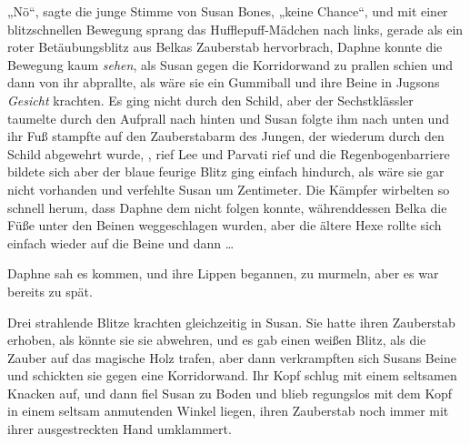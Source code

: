 „Nö“, sagte die junge Stimme von Susan Bones, „keine Chance“, und mit einer blitzschnellen Bewegung sprang das Hufflepuff-Mädchen nach links, gerade als ein roter Betäubungsblitz aus Belkas Zauberstab hervorbrach, Daphne konnte die Bewegung kaum \emph{sehen}, als Susan gegen die Korridorwand zu prallen schien und dann von ihr abprallte, als wäre sie ein Gummiball und ihre Beine in Jugsons \emph{Gesicht} krachten. Es ging nicht durch den Schild, aber der Sechstklässler taumelte durch den Aufprall nach hinten und Susan folgte ihm nach unten und ihr Fuß stampfte auf den Zauberstabarm des Jungen, der wiederum durch den Schild abgewehrt wurde, , rief Lee und Parvati rief  und die Regenbogenbarriere bildete sich aber der blaue feurige Blitz ging einfach hindurch, als wäre sie gar nicht vorhanden und verfehlte Susan um Zentimeter. Die Kämpfer wirbelten so schnell herum, dass Daphne dem nicht folgen konnte, währenddessen Belka die Füße unter den Beinen weggeschlagen wurden, aber die ältere Hexe rollte sich einfach wieder auf die Beine und dann …

Daphne sah es kommen, und ihre Lippen begannen,  zu murmeln, aber es war bereits zu spät.

Drei strahlende Blitze krachten gleichzeitig in Susan. Sie hatte ihren Zauberstab erhoben, als könnte sie sie abwehren, und es gab einen weißen Blitz, als die Zauber auf das magische Holz trafen, aber dann verkrampften sich Susans Beine und schickten sie gegen eine Korridorwand. Ihr Kopf schlug mit einem seltsamen Knacken auf, und dann fiel Susan zu Boden und blieb regungslos mit dem Kopf in einem seltsam anmutenden Winkel liegen, ihren Zauberstab noch immer mit ihrer ausgestreckten Hand umklammert.

